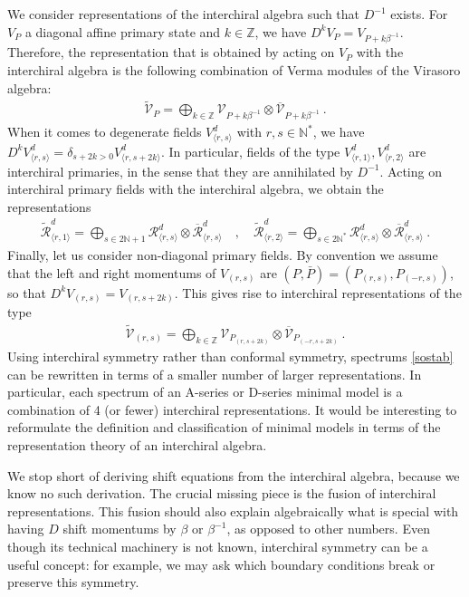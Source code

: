 \documentclass[12pt, a4paper]{article}
\theoremstyle{break}
\begin{document}
We consider representations of the interchiral algebra such that $D^{-1}$ exists. For $V_P$ a diagonal affine primary state and $k\in\mathbb{Z}$, we have $D^{k}V_P = V_{P+k\beta^{-1}}$. Therefore, the representation that is obtained by acting on $V_P$ with the interchiral algebra is the following combination of Verma modules of the Virasoro algebra:
\begin{align}
 \widetilde{\mathcal{V}}_P = \bigoplus_{k\in\mathbb{Z}} \mathcal{V}_{P+k\beta^{-1}}\otimes \overline{\mathcal{V}}_{P+k\beta^{-1}}\ . 
 \label{wvp}
\end{align}
When it comes to degenerate fields $V_{\langle r,s\rangle}^d$ with $r,s\in\mathbb{N}^*$, we have $D^k V_{\langle r,s\rangle}^d = \delta_{s+2k>0} V^d_{\langle r,s+2k\rangle}$. In particular, fields of the type $V_{\langle r,1\rangle}^d,V_{\langle r,2\rangle}^d$ are interchiral primaries, in the sense that they are annihilated by $D^{-1}$. Acting on interchiral primary fields with the interchiral algebra, we obtain the representations
\begin{align}
 \widetilde{\mathcal{R}}^d_{\langle r,1\rangle} = \bigoplus_{s\in 2\mathbb{N}+1} \mathcal{R}^d_{\langle r, s\rangle} \otimes \overline{\mathcal{R}}^d_{\langle r, s\rangle} 
 \quad ,\quad 
\widetilde{\mathcal{R}}^d_{\langle r,2\rangle} = \bigoplus_{s\in 2\mathbb{N}^*} \mathcal{R}^d_{\langle r, s\rangle} \otimes \overline{\mathcal{R}}^d_{\langle r, s\rangle}\ . 
 \end{align}
Finally, let us consider non-diagonal primary fields. By convention we assume that the left and right momentums of $V_{(r,s)}$ are $(P,\bar P)=(P_{(r,s)},P_{(-r,s)})$, so that $D^k V_{(r,s)} = V_{(r,s+2k)}$. This gives rise to interchiral representations of the type 
\begin{align}
 \widetilde{\mathcal{V}}_{(r,s)} = \bigoplus_{k\in\mathbb{Z}} \mathcal{V}_{P_{(r,s+2k)}}\otimes \overline{\mathcal{V}}_{P_{(-r,s+2k)}}\ . 
 \label{wvrs}
\end{align}
Using interchiral symmetry rather than conformal symmetry, spectrums \eqref{sostab} can be rewritten in terms of a smaller number of larger representations. In particular, each spectrum of an A-series or D-series minimal model is a combination of 4 (or fewer) interchiral representations. It would be interesting to reformulate the definition and classification of minimal models in terms of the representation theory of an interchiral algebra.  

We stop short of deriving shift equations from the interchiral algebra, because we know no such derivation. The crucial missing piece is the fusion of interchiral representations. 
This fusion should also explain algebraically what is special with having $D$ shift momentums by $\beta$ or $\beta^{-1}$, as opposed to other numbers. Even though its technical machinery is not known, interchiral symmetry can be a useful concept: for example, we may ask which boundary conditions break or preserve this symmetry. 
\end{document}
